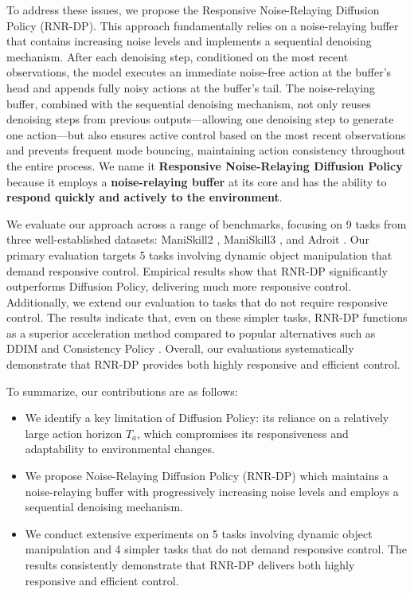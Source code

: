 To address these issues, we propose the Responsive Noise-Relaying Diffusion Policy (RNR-DP). This approach fundamentally relies on a noise-relaying buffer that contains increasing noise levels and implements a sequential denoising mechanism. After each denoising step, conditioned on the most recent observations, the model executes an immediate noise-free action at the buffer's head and appends fully noisy actions at the buffer's tail. The noise-relaying buffer, combined with the sequential denoising mechanism, not only reuses denoising steps from previous outputs—allowing one denoising step to generate one action—but also ensures active control based on the most recent observations and prevents frequent mode bouncing, maintaining action consistency throughout the entire process. We name it \textbf{Responsive Noise-Relaying Diffusion Policy} because it employs a \textbf{noise-relaying buffer} at its core and has the ability to \textbf{respond quickly and actively to the environment}.

We evaluate our approach across a range of benchmarks, focusing on 9 tasks from three well-established datasets: ManiSkill2 \citep{gu2023maniskill2}, ManiSkill3 \citep{tao2024maniskill3}, and Adroit \citep{rajeswaran2017learning}. Our primary evaluation targets 5 tasks involving dynamic object manipulation that demand responsive control. Empirical results show that RNR-DP significantly outperforms Diffusion Policy, delivering much more responsive control. Additionally, we extend our evaluation to tasks that do not require responsive control. The results indicate that, even on these simpler tasks, RNR-DP functions as a superior acceleration method compared to popular alternatives such as DDIM \citep{song2020denoising} and Consistency Policy \citep{song2023consistency, prasad2024consistency}. Overall, our evaluations systematically demonstrate that RNR-DP provides both highly responsive and efficient control.

To summarize, our contributions are as follows:

\begin{itemize}
  \item We identify a key limitation of Diffusion Policy: its reliance on a relatively large action horizon \( T_a \), which compromises its responsiveness and adaptability to environmental changes.
  \item We propose Noise-Relaying Diffusion Policy (RNR-DP) which maintains a noise-relaying buffer with progressively increasing noise levels and employs a sequential denoising mechanism.
  \item We conduct extensive experiments on 5 tasks involving dynamic object manipulation and 4 simpler tasks that do not demand responsive control. The results consistently demonstrate that RNR-DP delivers both highly responsive and efficient control.
\end{itemize}

